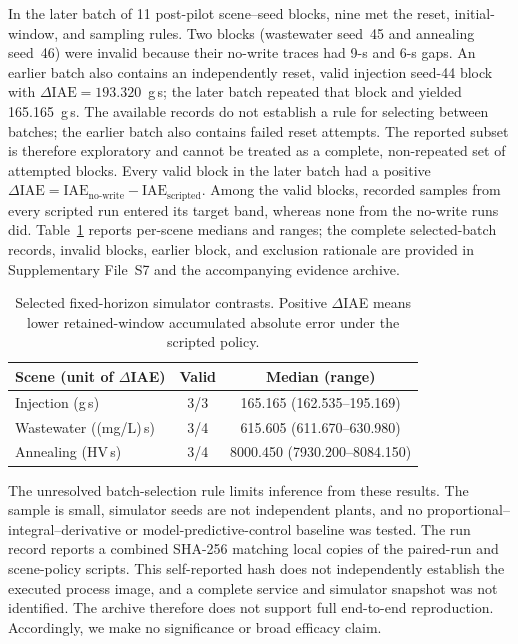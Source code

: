 In the later batch of 11 post-pilot scene--seed blocks, nine met the reset, initial-window, and sampling rules. Two blocks (wastewater seed~45 and annealing seed~46) were invalid because their no-write traces had 9-s and 6-s gaps. An earlier batch also contains an independently reset, valid injection seed-44 block with $\Delta\mathrm{IAE}=193.320$~g\,s; the later batch repeated that block and yielded 165.165~g\,s. The available records do not establish a rule for selecting between batches; the earlier batch also contains failed reset attempts. The reported subset is therefore exploratory and cannot be treated as a complete, non-repeated set of attempted blocks. Every valid block in the later batch had a positive $\Delta\mathrm{IAE}=\mathrm{IAE}_{\mathrm{no\text{-}write}}-\mathrm{IAE}_{\mathrm{scripted}}$. Among the valid blocks, recorded samples from every scripted run entered its target band, whereas none from the no-write runs did. Table~\ref{tab:selected-iae} reports per-scene medians and ranges; the complete selected-batch records, invalid blocks, earlier block, and exclusion rationale are provided in Supplementary File~S7 and the accompanying evidence archive.

\begin{table}[!t]
\centering
\caption{Selected fixed-horizon simulator contrasts. Positive $\Delta$IAE means lower retained-window accumulated absolute error under the scripted policy.}
\label{tab:selected-iae}
\footnotesize
\setlength{\tabcolsep}{3pt}
\begin{tabular}{@{}lcc@{}}
\toprule
Scene (unit of $\Delta$IAE) & Valid & Median (range) \\
\midrule
Injection (g\,s) & 3/3 & 165.165 (162.535--195.169) \\
Wastewater ((mg/L)\,s) & 3/4 & 615.605 (611.670--630.980) \\
Annealing (HV\,s) & 3/4 & 8000.450 (7930.200--8084.150) \\
\bottomrule
\end{tabular}
\end{table}

The unresolved batch-selection rule limits inference from these results. The sample is small, simulator seeds are not independent plants, and no proportional--integral--derivative or model-predictive-control baseline was tested. The run record reports a combined SHA-256 matching local copies of the paired-run and scene-policy scripts. This self-reported hash does not independently establish the executed process image, and a complete service and simulator snapshot was not identified. The archive therefore does not support full end-to-end reproduction. Accordingly, we make no significance or broad efficacy claim.

